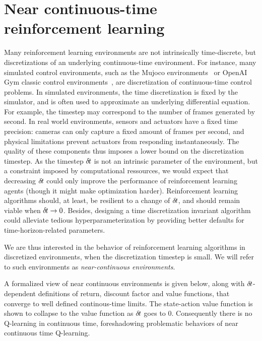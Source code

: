 \section{Near continuous-time reinforcement learning}
\label{sec:framework}

Many reinforcement learning environments are not intrinsically
time-discrete, but discretizations of an underlying continuous-time
environment. For instance, many simulated control environments, such as
the Mujoco environments~\cite{ddpg} or OpenAI Gym classic control
environments~\cite{gym}, are discretization of continuous-time control
problems.  In simulated environments, the time discretization is fixed by
the simulator, and is often used to approximate an underlying
differential equation.  For example, the timestep may correspond to the
number of frames generated by second.  In real world environments,
sensors and actuators have a fixed time precision: cameras can only
capture a fixed amount of frames per second, and physical limitations
prevent actuators from responding instantaneously. The quality of these
components thus imposes a lower bound on the discretization timestep. As
the timestep ${\delta\hspace{-.1em}t}$ is not an intrinsic parameter of the
environment, but a constraint imposed by computational ressources, we
would expect that decreasing ${\delta\hspace{-.1em}t}$ could only improve the performance
of reinforcement learning agents (though it might make optimization
harder).  Reinforcement
learning algorithms should, at least, be resilient to a change of
${\delta\hspace{-.1em}t}$, and should remain viable when ${\delta\hspace{-.1em}t} \rightarrow 0$.
Besides, designing a time discretization invariant algorithm could
alleviate tedious hyperparameterization by providing better defaults for
time-horizon-related parameters.

We are thus interested in the behavior of reinforcement learning
algorithms in discretized environments, when the discretization timestep
is small. We will refer to such environments as \emph{near-continuous
environments}.

A formalized view of near continuous environments is
given below, along with ${\delta\hspace{-.1em}t}$-dependent definitions of return, discount
factor and value functions, that converge to well defined
continous-time limits. The state-action value
function is shown to collapse to the value function as ${\delta\hspace{-.1em}t}$ goes to $0$.
Consequently there is no Q-learning in continuous time, foreshadowing
problematic behaviors of near continuous time Q-learning.

